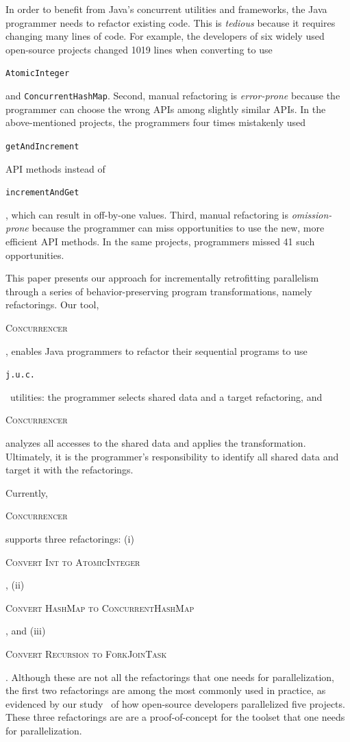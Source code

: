 \documentclass[10pt,twocolumn]{article}
\newcommand\Feedback[1]{#1}
\newcommand{\tool}{\begin{scriptsize}\textsc{Concurrencer}\end{scriptsize}\xspace}
\newcommand{\code}[1]{\begin{smaller}\texttt{#1}\end{smaller}}
\newcommand{\codex}[1]{{\smaller\texttt{#1}}\xspace}
\newcommand{\humanOmissions}{{41}\xspace}
\newcommand{\LOCchangedManually}{{1019}\xspace}
\newcommand{\ConvertToAtomicInteger}{{\begin{smaller}\begin{smaller}\textsc{Convert Int to AtomicInteger}\end{smaller}\end{smaller}}\xspace}
\newcommand{\ConvertToConcurrentHashMap}{{\begin{smaller}\begin{smaller}\textsc{Convert HashMap to ConcurrentHashMap}\end{smaller}\end{smaller}}\xspace}
\newcommand{\ConvertToForkJoinTask}{{\begin{smaller}\begin{smaller}\textsc{Convert Recursion to ForkJoinTask}\end{smaller}\end{smaller}}\xspace}
\newcommand{\ConcurrentHashMap}{\codex{Con\-cur\-rent\-Hash\-Map}}
\begin{document}
In order to benefit from Java's concurrent utilities and frameworks,
the Java programmer needs to refactor existing code. This is \emph{tedious}
because it requires changing many lines of code. For example, the developers of
six widely used open-source projects changed \LOCchangedManually lines when
converting to use \Feedback{\code{AtomicInteger} and \ConcurrentHashMap}.
Second, manual refactoring is \emph{error-prone} because the programmer can choose the wrong APIs among
slightly similar APIs. In the above-mentioned projects, the programmers four
times mistakenly used \code{getAndIncrement} API methods instead of
\code{incrementAndGet}, which can result in off-by-one values. Third, manual
refactoring is \emph{omission-prone} because the programmer can miss
opportunities to use the new, more efficient API methods. In the same projects,
programmers missed \humanOmissions such opportunities.


This paper presents our approach for incrementally retrofitting parallelism
through a series of behavior-preserving program transformations, namely
refactorings. Our tool, \tool, enables Java programmers to refactor their
sequential programs to use \code{j.u.c.}\ utilities: the programmer selects
shared data and a target refactoring, and \tool analyzes all accesses to the shared data and applies the 
transformation. Ultimately, it is the programmer's responsibility to identify
all shared data and target it with the refactorings.


Currently, \tool supports three refactorings: (i)
\ConvertToAtomicInteger, (ii) \ConvertToConcurrentHashMap, and
(iii) \ConvertToForkJoinTask. Although these are not all the refactorings
that one needs for parallelization, the first two refactorings are among the
most commonly used in practice, as evidenced by our
study~\cite{Dig'08:studyOfConcurrentTransformations} of how open-source
developers parallelized five projects. These three refactorings are are a
proof-of-concept for the toolset that one needs for parallelization.
\end{document}

